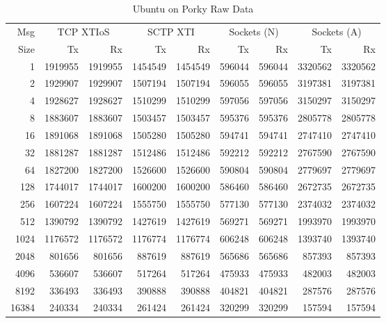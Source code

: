 \documentclass[letterpaper,final,notitlepage,twocolumn,10pt,twoside]{article}
\let\normalsize = \small
\let\small = \footnotesize
\let\footnotesize = \scriptsize
\let\scriptsize = \tiny
\begin{document}
\begin{appendix}
\begin{table}[hbp]
\footnotesize
\begin{center}
\setlength{\tabcolsep}{0.2em}
\setlength{\arraycolsep}{0.2em}
\begin{tabular}{rrrrrrrrr}\\
Msg & \multicolumn{2}{c}{TCP XTIoS} & \multicolumn{2}{c}{SCTP XTI} & \multicolumn{2}{c}{Sockets (N)} & \multicolumn{2}{c}{Sockets (A)}\\
Size & Tx & Rx & Tx & Rx & Tx & Rx & Tx & Rx\\
\hline
\hline
1 & 1919955 & 1919955 & 1454549 & 1454549 & 596044 & 596044 & 3320562 & 3320562\\
2 & 1929907 & 1929907 & 1507194 & 1507194 & 596055 & 596055 & 3197381 & 3197381\\
4 & 1928627 & 1928627 & 1510299 & 1510299 & 597056 & 597056 & 3150297 & 3150297\\
8 & 1883607 & 1883607 & 1503457 & 1503457 & 595376 & 595376 & 2805778 & 2805778\\
16 & 1891068 & 1891068 & 1505280 & 1505280 & 594741 & 594741 & 2747410 & 2747410\\
32 & 1881287 & 1881287 & 1512486 & 1512486 & 592212 & 592212 & 2767590 & 2767590\\
64 & 1827200 & 1827200 & 1526600 & 1526600 & 590804 & 590804 & 2779697 & 2779697\\
128 & 1744017 & 1744017 & 1600200 & 1600200 & 586460 & 586460 & 2672735 & 2672735\\
256 & 1607224 & 1607224 & 1555750 & 1555750 & 577130 & 577130 & 2374032 & 2374032\\
512 & 1390792 & 1390792 & 1427619 & 1427619 & 569271 & 569271 & 1993970 & 1993970\\
1024 & 1176572 & 1176572 & 1176774 & 1176774 & 606248 & 606248 & 1393740 & 1393740\\
2048 & 801656 & 801656 & 887619 & 887619 & 565686 & 565686 & 857393 & 857393\\
4096 & 536607 & 536607 & 517264 & 517264 & 475933 & 475933 & 482003 & 482003\\
8192 & 336493 & 336493 & 390888 & 390888 & 404821 & 404821 & 287576 & 287576\\
16384 & 240334 & 240334 & 261424 & 261424 & 320299 & 320299 & 157594 & 157594\\
\hline
\end{tabular}
\end{center}
\normalsize
\caption[Ubuntu on Porky Raw Data]{Ubuntu on Porky Raw Data}
\label{table:u704data}
\end{table}


\end{appendix}
\end{document}
